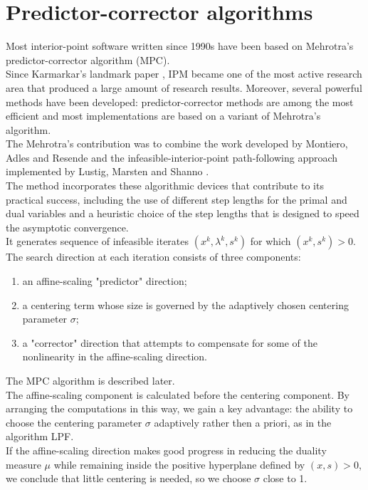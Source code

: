 \documentclass[a4paper,10 pt,titlepage,twoside]{book}
\theoremstyle{plain}
\theoremstyle{definition}
\theoremstyle{remark}
\begin{document}
\section{Predictor-corrector algorithms}
Most interior-point software written since 1990s have been based on Mehrotra's predictor-corrector algorithm (MPC).\\
Since Karmarkar's landmark paper \cite{Kar}, IPM became one of the most active research area that produced a large amount of research results. Moreover, several powerful methods have been developed: predictor-corrector methods are among the most efficient and most implementations are based on a variant of Mehrotra's algorithm. \\
The Mehrotra's contribution was to combine the work developed by Montiero, Adles and Resende \cite{MARE} and the infeasible-interior-point path-following approach implemented by Lustig, Marsten and Shanno \cite{LMS}.\\ 
The method incorporates these algorithmic devices that contribute to its practical success, including the use of different step lengths for the primal and dual variables and a heuristic choice of the step lengths that is designed to speed the asymptotic convergence.\\
It generates sequence of infeasible iterates $(x^{k},\lambda^{k},s^{k})$ for which $(x^{k},s^{k})>0$. The search direction at each iteration consists of three components:
\begin{enumerate}
	\item an affine-scaling "predictor" direction;
	\item a centering term whose size is governed by the adaptively chosen centering parameter $\sigma$;
	\item a "corrector" direction that attempts to compensate for some of the nonlinearity in the affine-scaling direction.
	\end{enumerate}
The MPC algorithm is described later. \\
The affine-scaling component is calculated before the centering component. By arranging the computations in this way, we gain a key advantage: the ability to choose the centering parameter $\sigma$ adaptively rather then a priori, as in the algorithm LPF.\\
If the affine-scaling direction makes good progress in reducing the duality measure $\mu$ while remaining inside the positive hyperplane defined by $(x,s)>0$, we conclude that little centering is needed, so we choose $\sigma$ close to 1.
\end{document}
